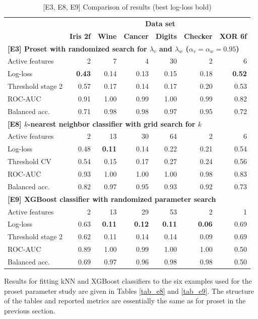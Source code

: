 %
\begin{table}
\caption{[E3, E8, E9] Comparison of results (best log-loss bold)}
\label{tab_e3_e8_e9}
%
\begin{center}
\small
\begin{tabular}{|lrrrrrr|}
\hline
&\multicolumn{6}{c|}{\textbf{\hrulefill\ Data set \hrulefill}}\\
&\textbf{Iris 2f}&\textbf{Wine}&\textbf{Cancer}&\textbf{Digits}&\textbf{Checker}&\textbf{XOR 6f}\\
\multicolumn{7}{|l|}{\textbf{[E3] Proset with randomized search for $\lambda_v$ and $\lambda_w$ ($\alpha_v=\alpha_w=0.95$)}}\\
Active features&2&7&4&30&2&6\\
Log-loss&\textbf{0.43}&0.14&0.13&0.15&0.18&\textbf{0.52}\\
Threshold stage 2&0.57&0.17&0.14&0.17&0.20&0.53\\
ROC-AUC&0.91&1.00&0.99&1.00&0.99&0.82\\
Balanced acc.&0.71&0.98&0.98&0.97&0.95&0.72\\
\multicolumn{7}{|l|}{\textbf{[E8] $k$-nearest neighbor classifier with grid search for $k$}}\\
Active features&2&13&30&64&2&6\\
Log-loss&0.48&\textbf{0.11}&0.14&0.22&0.21&0.54\\
Threshold CV&0.54&0.15&0.17&0.27&0.24&0.56\\
ROC-AUC&0.93&1.00&1.00&1.00&0.98&0.83\\
Balanced acc.&0.82&0.97&0.95&0.93&0.92&0.73\\
\multicolumn{7}{|l|}{\textbf{[E9] XGBoost classifier with randomized parameter search}}\\
Active features&2&13&29&53&2&1\\
Log-loss&0.63&\textbf{0.11}&\textbf{0.12}&\textbf{0.11}&\textbf{0.06}&0.69\\
Threshold stage 2&0.62&0.11&0.14&0.14&0.09&0.69\\
ROC-AUC&0.89&1.00&0.99&1.00&1.00&0.50\\
Balanced acc.&0.69&0.97&0.96&0.98&0.98&0.50\\
\hline
\end{tabular}
\end{center}
\end{table}
%
Results for fitting kNN and XGBoost classifiers to the six examples used for the proset parameter study are given in Tables \ref{tab_e8} and \ref{tab_e9}.
The structure of the tables and reported metrics are essentially the same as for proset in the previous section.
